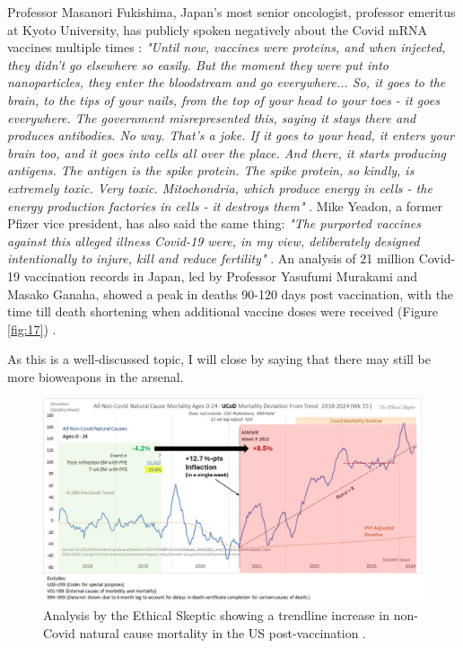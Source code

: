 \documentclass[10pt,twocolumn,letterpaper]{article}
\begin{document}
Professor Masanori Fukishima, Japan's most senior oncologist, professor emeritus at Kyoto University, has publicly spoken negatively about the Covid mRNA vaccines multiple times \cite{35,36}: \textit{"Until now, vaccines were proteins, and when injected, they didn't go elsewhere so easily. But the moment they were put into nanoparticles, they enter the bloodstream and go everywhere... So, it goes to the brain, to the tips of your nails, from the top of your head to your toes - it goes everywhere. The government misrepresented this, saying it stays there and produces antibodies. No way. That's a joke. If it goes to your head, it enters your brain too, and it goes into cells all over the place. And there, it starts producing antigens. The antigen is the spike protein. The spike protein, so kindly, is extremely toxic. Very toxic. Mitochondria, which produce energy in cells - the energy production factories in cells - it destroys them"} \cite{37,38}. Mike Yeadon, a former Pfizer vice president, has also said the same thing: \textit{"The purported vaccines against this alleged illness Covid-19 were, in my view, deliberately designed intentionally to injure, kill and reduce fertility"} \cite{39}. An analysis of 21 million Covid-19 vaccination records in Japan, led by Professor Yasufumi Murakami and Masako Ganaha, showed a peak in deaths 90-120 days post vaccination, with the time till death shortening when additional vaccine doses were received (Figure \ref{fig:17}) \cite{40,41}.

As this is a well-discussed topic, I will close by saying that there may still be more bioweapons in the arsenal.

\begin{figure}[t]
\begin{center}
\includegraphics[width=1\textwidth]{tes1.jpeg}
\end{center}
   \caption{Analysis by the Ethical Skeptic showing a trendline increase in non-Covid natural cause mortality in the US post-vaccination \cite{42}.}
   \label{fig:18}
\end{figure}
\end{document}
